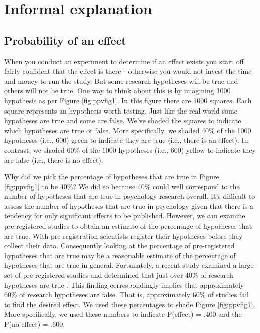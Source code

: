 \documentclass[
]{krantz}
\begin{document}
\hypertarget{informal-explanation}{%
\section{Informal explanation}\label{informal-explanation}}

\hypertarget{probability-of-an-effect}{%
\subsection{Probability of an effect}\label{probability-of-an-effect}}

When you conduct an experiment to determine if an effect exists you start off fairly confident that the effect is there - otherwise you would not invest the time and money to run the study. But some research hypotheses will be true and others will not be true. One way to think about this is by imagining 1000 hypothesis as per Figure \ref{fig:ppvfig1}. In this figure there are 1000 squares. Each square represents an hypothesis worth testing. Just like the real world some hypotheses are true and some are false. We've shaded the squares to indicate which hypotheses are true or false. More specifically, we shaded 40\% of the 1000 hypotheses (i.e., 600) green to indicate they are true (i.e., there is an effect). In contrast, we shaded 60\% of the 1000 hypotheses (i.e., 600) yellow to indicate they are false (i.e., there is no effect).

Why did we pick the percentage of hypotheses that are true in Figure \ref{fig:ppvfig1} to be 40\%? We did so because 40\% could well correspond to the number of hypotheses that are true in psychology research overall. It's difficult to assess the number of hypotheses that are true in psychology given that there is a tendency for only significant effects to be published. However, we can examine pre-registered studies to obtain an estimate of the percentage of hypotheses that are true. With pre-registration scientists register their hypotheses before they collect their data. Consequently looking at the percentage of pre-registered hypotheses that are true may be a reasonable estimate of the percentage of hypotheses that are true in general. Fortunately, a recent study examined a large set of pre-registered studies and determined that just over 40\% of research hypotheses are true \citep{scheel2020excess}. This finding correspondingly implies that approximately 60\% of research hypotheses are false. That is, approximately 60\% of studies fail to find the desired effect. We used these percentages to shade Figure \ref{fig:ppvfig1}. More specifically, we used these numbers to indicate P(effect) = .400 and the P(no effect) = .600.
\end{document}

